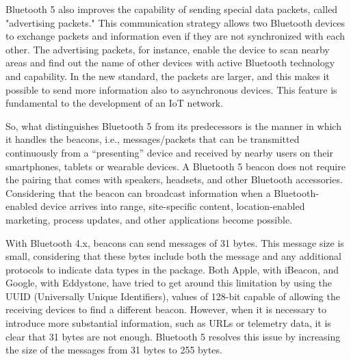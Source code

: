 \documentclass[12pt, draftclsnofoot, onecolumn]{IEEEtran}
\begin{document}
Bluetooth 5 also improves the capability of sending special data packets, called "advertising packets." This communication strategy allows two Bluetooth devices to exchange packets and information even if they are not synchronized with each other. The advertising packets, for instance, enable the device to scan nearby areas and find out the name of other devices with active Bluetooth technology and capability. In the new standard, the packets are larger, and this makes it possible to send more information also to asynchronous devices. This feature is fundamental to the development of an IoT network.

So, what distinguishes Bluetooth 5 from its predecessors is the manner in which it handles the beacons, i.e., messages/packets that can be transmitted continuously from a “presenting” device and received by nearby users on their smartphones, tablets or wearable devices. A Bluetooth 5 beacon does not require the pairing that comes with speakers, headsets, and other Bluetooth accessories. Considering that the beacon can broadcast information when a Bluetooth-enabled device arrives into range, site-specific content, location-enabled marketing, process updates, and other applications become possible. 

With Bluetooth 4.x, beacons can send messages of 31 bytes. This message size is small, considering that these bytes include both the message and any additional protocols to indicate data types in the package. Both Apple, with iBeacon, and Google, with Eddystone, have tried to get around this limitation by using the UUID (Universally Unique Identifiers), values of 128-bit capable of allowing the receiving devices to find a different beacon. However, when it is necessary to introduce more substantial information, such as URLs or telemetry data, it is clear that 31 bytes are not enough. Bluetooth 5 resolves this issue by increasing the size of the messages from 31 bytes to 255 bytes. 
\end{document}
